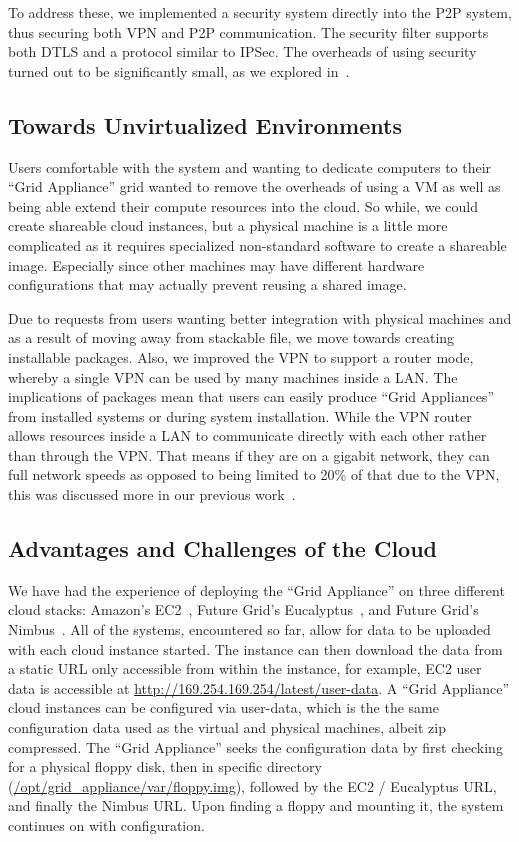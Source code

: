\documentclass[conference]{IEEEtran}
\begin{document}
To address these, we implemented a security system directly into the P2P
system, thus securing both VPN and P2P communication.  The security filter
supports both DTLS and a protocol similar to IPSec.  The overheads of using
security turned out to be significantly small, as we explored
in~\cite{groupvpn}.

\subsection{Towards Unvirtualized Environments}

Users comfortable with the system and wanting to dedicate computers to their
``Grid Appliance'' grid wanted to remove the overheads of using a VM as well as
being able extend their compute resources into the cloud.  So while, we could
create shareable cloud instances, but a physical machine is a little more
complicated as it requires specialized non-standard software to create a
shareable image.  Especially since other machines may have different hardware
configurations that may actually prevent reusing a shared image.

Due to requests from users wanting better integration with physical machines
and as a result of moving away from stackable file, we move towards creating
installable packages.  Also, we improved the VPN to support a router mode,
whereby a single VPN can be used by many machines inside a LAN.  The
implications of packages mean that users can easily produce ``Grid Appliances''
from installed systems or during system installation.  While the VPN router
allows resources inside a LAN to communicate directly with each other rather
than through the VPN.  That means if they are on a gigabit network, they can
full network speeds as opposed to being limited to 20\% of that due to the VPN,
this was discussed more in our previous work~\cite{sc09}.

\subsection{Advantages and Challenges of the Cloud}

We have had the experience of deploying the ``Grid Appliance'' on three
different cloud stacks:  Amazon's EC2~\cite{ec2}, Future Grid's
Eucalyptus~\cite{eucalyptus}, and Future Grid's Nimbus~\cite{nimbus}.  All of
the systems, encountered so far, allow for data to be uploaded with each cloud
instance started.  The instance can then download the data from a static URL
only accessible from within the instance, for example, EC2 user data is
accessible at \url{http://169.254.169.254/latest/user-data}. A ``Grid
Appliance'' cloud instances can be configured via user-data, which is the the
same configuration data used as the virtual and physical machines, albeit zip
compressed.  The ``Grid Appliance'' seeks the configuration data by first
checking for a physical floppy disk, then in specific directory
(\url{/opt/grid\_appliance/var/floppy.img}), followed by the EC2 / Eucalyptus
URL, and finally the Nimbus URL.  Upon finding a floppy and mounting it, the
system continues on with configuration.
\end{document}
